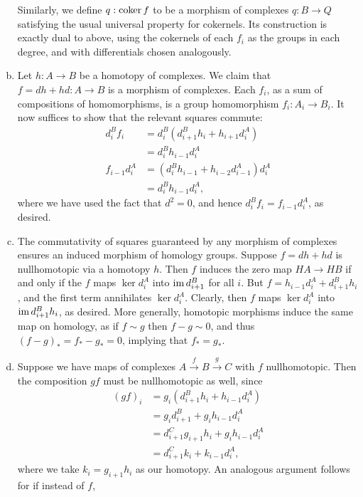 \documentclass{../mathnotes}
\begin{document}
\begin{enumerate}[(a)]
        Similarly, we define $q:\operatorname{coker} f$ to be a morphism of complexes $q:B\to Q$ satisfying the
        usual universal property for cokernels. Its construction is exactly dual to above, using the
        cokernels of each $f_i$ as the groups in each degree, and with differentials chosen analogously.
    \item Let $h:A\to B$ be a homotopy of complexes. We claim that $f=dh+hd:A\to B$ is a morphism of complexes.
        Each $f_i$,  as a sum of compositions of homomorphisms, is a group homomorphism $f_i:A_i\to B_i$.
        It now suffices to show that the relevant squares commute:
        \begin{align*}
            d_i^Bf_i &= d_i^B(d_{i+1}^Bh_i+h_{i+1}d_i^A)\\
            &= d_i^Bh_{i-1}d_i^A\\
            f_{i-1}d_i^A &= (d_i^Bh_{i-1}+h_{i-2}d_{i-1}^A)d_i^A\\
            &= d_i^Bh_{i-1}d_i^A,
        \end{align*}
        where we have used the fact that $d^2=0$, and hence $d_i^Bf_i=f_{i-1}d_i^A$, as desired.
    \item The commutativity of squares guaranteed by any morphism of complexes ensures an induced
        morphism of homology groups. Suppose $f=dh+hd$ is nullhomotopic via a homotopy $h$. Then $f$
        induces the zero map $HA\to HB$ if and only if the $f$ maps $\ker d_i^A$ into $\operatorname{im} d_{i+1}^B$
        for all $i$. But $f=h_{i-1}d_i^A+d_{i+1}^Bh_i$, and the first term annihilates $\ker d_i^A$.
        Clearly, then $f$ maps $\ker d_i^A$ into $\operatorname{im} d_{i+1}^Bh_i$, as desired. More generally,
        homotopic morphisms induce the same map on homology, as if $f\sim g$ then $f-g\sim 0$, and thus
        $(f-g)_*=f_*-g_*=0$, implying that $f_*=g_*$.
    \item Suppose we have maps of complexes $A\xrightarrow{f} B\xrightarrow{g}C$ with $f$ nullhomotopic.
        Then the composition $gf$ must be nullhomotopic as well, since
        \begin{align*}
            (gf)_i &= g_i(d_{i+1}^Bh_i+h_{i-1}d_i^A)\\
            &= g_id_{i+1}^B+g_ih_{i-1}d_i^A\\
            &= d_{i+1}^Cg_{i+1}h_i+g_ih_{i-1}d_i^A\\
            &= d_{i+1}^Ck_i+k_{i-1}d_i^A,
        \end{align*}
        where we take $k_i=g_{i+1}h_i$ as our homotopy. An analogous argument follows for if instead of $f$,

\end{enumerate}
\end{document}
